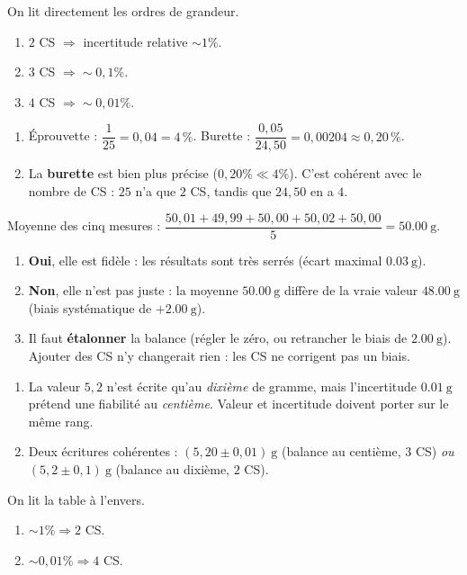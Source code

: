 \documentclass[11pt,a4paper]{article}
\begin{document}
\begin{corrige}
On lit directement les ordres de grandeur.
\begin{enumerate}[label=\alph*)]
  \item $2$ CS $\Rightarrow$ incertitude relative $\sim 1\%$.
  \item $3$ CS $\Rightarrow \sim 0,1\%$.
  \item $4$ CS $\Rightarrow \sim 0,01\%$.
\end{enumerate}
\end{corrige}

\begin{corrige}
\begin{enumerate}[label=\alph*)]
  \item Éprouvette : $\dfrac{1}{25}=0,04=\boxed{4\,\%}$. \quad Burette : $\dfrac{0,05}{24,50}=0,00204\approx\boxed{0,20\,\%}$.
  \item La \textbf{burette} est bien plus précise ($0,20\%\ll 4\%$). C'est cohérent avec le nombre de CS :
        $25$ n'a que $2$ CS, tandis que $24,50$ en a $4$.
\end{enumerate}
\end{corrige}

\begin{corrige}
Moyenne des cinq mesures : $\dfrac{50,01+49,99+50,00+50,02+50,00}{5}=\qty{50,00}{\gram}$.
\begin{enumerate}[label=\alph*)]
  \item \textbf{Oui}, elle est fidèle : les résultats sont très serrés (écart maximal $\qty{0,03}{\gram}$).
  \item \textbf{Non}, elle n'est pas juste : la moyenne $\qty{50,00}{\gram}$ diffère de la vraie valeur
        $\qty{48,00}{\gram}$ (biais systématique de $+\qty{2,00}{\gram}$).
  \item Il faut \textbf{étalonner} la balance (régler le zéro, ou retrancher le biais de $\qty{2,00}{\gram}$).
        Ajouter des CS n'y changerait rien : les CS ne corrigent pas un biais.
\end{enumerate}
\end{corrige}

\begin{corrige}
\begin{enumerate}[label=\alph*)]
  \item La valeur $5,2$ n'est écrite qu'au \emph{dixième} de gramme, mais l'incertitude $\qty{0,01}{\gram}$
        prétend une fiabilité au \emph{centième}. Valeur et incertitude doivent porter sur le même rang.
  \item Deux écritures cohérentes : $(5,20\pm0,01)\ \si{\gram}$ (balance au centième, $3$ CS) \emph{ou}
        $(5,2\pm0,1)\ \si{\gram}$ (balance au dixième, $2$ CS).
\end{enumerate}
\end{corrige}

\begin{corrige}
On lit la table à l'envers.
\begin{enumerate}[label=\alph*)]
  \item $\sim 1\% \Rightarrow 2$ CS.
  \item $\sim 0,01\% \Rightarrow 4$ CS.
\end{enumerate}
\end{corrige}
\end{document}
